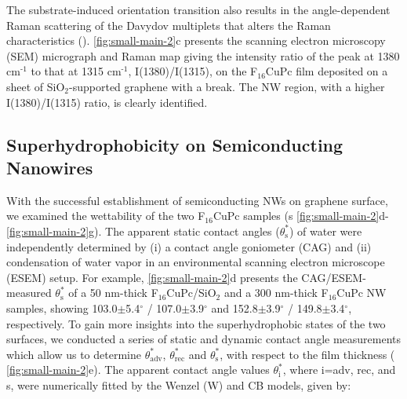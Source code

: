 The substrate-induced orientation transition also
results in the angle-dependent Raman scattering of the Davydov multiplets
that alters the Raman characteristics \cite{Cerdeira_2013_RamanF16}
().  \autoref{fig:small-main-2}c
presents the scanning electron microscopy (SEM) micrograph and Raman
map giving the intensity ratio of the peak at 1380 cm\(^{\text{-1}}\)
to that at 1315 cm\(^{\text{-1}}\), I(1380)/I(1315), on the
F\(_{\text{16}}\)CuPc film deposited on a sheet of
SiO\(_{\text{2}}\)-supported graphene with a break. The NW region,
with a higher I(1380)/I(1315) ratio, is clearly identified.


\subsection{Superhydrophobicity on Semiconducting Nanowires}
\label{sec:small-superhydr-nw}


With the successful establishment of semiconducting NWs on graphene
surface, we examined the wettability of the two F\(_{\text{16}}\)CuPc
samples (s
\autoref{fig:small-main-2}d-\autoref{fig:small-main-2}g).
%
The apparent
static contact angles (\(\theta_{\mathrm{s}}^{*}\)) of water were
independently determined by (i) a contact angle goniometer (CAG) and
(ii) condensation of water vapor in an environmental scanning electron
microscope (ESEM) setup. For example, \autoref{fig:small-main-2}d
presents the CAG/ESEM-measured \(\theta_{\mathrm{s}}^{*}\) of a 50
nm-thick F\(_{\text{16}}\)CuPc/SiO\(_{\text{2}}\) and a 300 nm-thick
F\(_{\text{16}}\)CuPc NW samples, showing 103.0\(\pm\)5.4\(^{\circ}\)
/ 107.0\(\pm\)3.9\(^{\circ}\) and 152.8\(\pm\)3.9\(^{\circ}\) /
149.8\(\pm\)3.4\(^{\circ}\), respectively. To gain more insights into
the superhydrophobic states of the two surfaces, we conducted a series
of static and dynamic contact angle measurements which allow us to
determine \(\theta_{\mathrm{adv}}^{*}\), \(\theta_{\mathrm{rec}}^{*}\)
and \(\theta_{\mathrm{s}}^{*}\), with respect to the film thickness (
\autoref{fig:small-main-2}e). The apparent contact angle values
\(\theta_{\mathrm{i}}^{*}\), where i=adv, rec, and s, were numerically
fitted by the Wenzel (W) \cite{Wenzel_1936_wetting} and CB
\cite{Cassie_1944_wet} models, given by:

